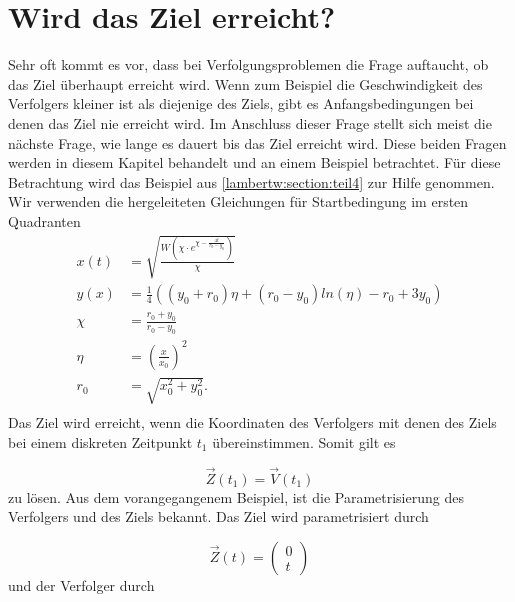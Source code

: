 %
%
%
\section{Wird das Ziel erreicht?
\label{lambertw:section:Wird_das_Ziel_erreicht}}

Sehr oft kommt es vor, dass bei Verfolgungsproblemen die Frage auftaucht, ob das Ziel überhaupt erreicht wird.
Wenn zum Beispiel die Geschwindigkeit des Verfolgers kleiner ist als diejenige des Ziels, gibt es Anfangsbedingungen bei denen das Ziel nie erreicht wird.
Im Anschluss dieser Frage stellt sich meist die nächste Frage, wie lange es dauert bis das Ziel erreicht wird.
Diese beiden Fragen werden in diesem Kapitel behandelt und an einem Beispiel betrachtet.
%
Für diese Betrachtung wird das Beispiel aus \eqref{lambertw:section:teil4} zur Hilfe genommen.
Wir verwenden die hergeleiteten Gleichungen für Startbedingung im ersten Quadranten
\begin{align*}
    x\left(t\right)
    &=
    \sqrt{\frac{W\left(\chi\cdot e^{\chi-\frac{4t}{r_0-y_0}}\right)}{\chi}} \\
    y(x)
    &=
    \frac{1}{4}\left(\left(y_0+r_0\right)\eta+\left(r_0-y_0\right)ln\left(\eta\right)-r_0+3y_0\right) \\
    \chi
    &=
    \frac{r_0+y_0}{r_0-y_0}\\
    \eta
    &=
    \left(\frac{x}{x_0}\right)^2 
    \\
    r_0
    &=
    \sqrt{x_0^2+y_0^2} \text{.}\\
\end{align*}
%
Das Ziel wird erreicht, wenn die Koordinaten des Verfolgers mit denen des Ziels bei einem diskreten Zeitpunkt $t_1$ übereinstimmen.
Somit gilt es

\begin{equation*}
    \vec{Z}(t_1)=\vec{V}(t_1)
\end{equation*}
%
zu lösen.
Aus dem vorangegangenem Beispiel, ist die Parametrisierung des Verfolgers und des Ziels bekannt.
Das Ziel wird parametrisiert durch

\begin{equation}
    \vec{Z}(t)
    =
    \left( \begin{array}{c} 0 \\ t \end{array} \right)
\end{equation}
%
und der Verfolger durch

